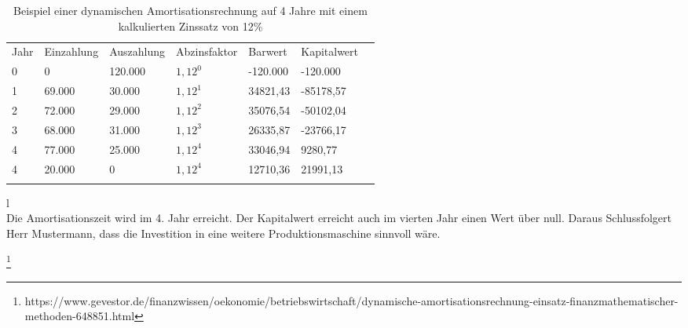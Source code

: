 \begin{table}[!h]
    \caption{Beispiel einer dynamischen Amortisationsrechnung auf 4 Jahre mit einem kalkulierten Zinssatz von 12\%}
    \begin{tabular}{lllllll}
        \cline{1-6} \rowcolor{gray}
        Jahr & Einzahlung & Auszahlung & Abzinsfaktor & Barwert  & Kapitalwert \\ \cline{1-6} \rowcolor{white}
        0    & 0          & 120.000    & $1,12^0$     & -120.000 & -120.000    \\ \cline{1-6} \rowcolor{white}
        1    & 69.000     & 30.000     & $1,12^1$     & 34821,43 & -85178,57   \\ \cline{1-6} \rowcolor{white}
        2    & 72.000     & 29.000     & $1,12^2$     & 35076,54 & -50102,04   \\ \cline{1-6} \rowcolor{white}
        3    & 68.000     & 31.000     & $1,12^3$     & 26335,87 & -23766,17   \\ \cline{1-6} \rowcolor{white}
        4    & 77.000     & 25.000     & $1,12^4$     & 33046,94 & 9280,77     \\ \cline{1-6} \rowcolor{white}
        4    & 20.000     & 0          & $1,12^4$     & 12710,36 & 21991,13    \\ \cline{1-6} \rowcolor{white}
    \end{tabular}
    \label{tb:dynamische Amortisationsrechnung}
\end{table}
\phantom l \\
Die Amortisationszeit wird im 4. Jahr erreicht. Der Kapitalwert erreicht auch im vierten Jahr einen Wert über null. Daraus Schlussfolgert Herr Mustermann, dass die Investition in eine weitere Produktionsmaschine sinnvoll wäre.

\footnote{https://www.gevestor.de/finanzwissen/oekonomie/betriebswirtschaft/dynamische-amortisationsrechnung-einsatz-finanzmathematischer-methoden-648851.html}
